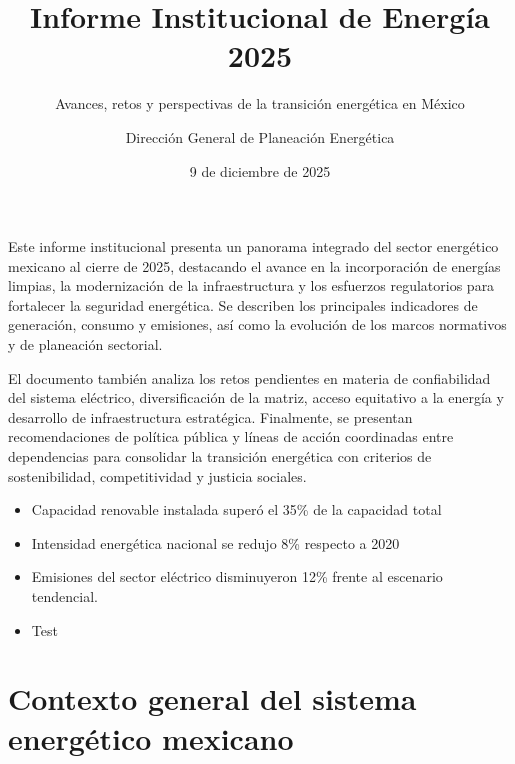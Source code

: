\documentclass{sener2025}
\title{Informe Institucional de Energía 2025}
\subtitle{Avances, retos y perspectivas de la transición energética en México}
\author{Dirección General de Planeación Energética}
\date{9 de diciembre de 2025}
\begin{document}

\tableofcontents
\newpage

\listafiguras
\newpage

\listatablas
\newpage

\begin{resumenejecutivo}
Este informe institucional presenta un panorama integrado del sector energético mexicano al cierre de 2025, destacando el avance en la incorporación de energías limpias, la modernización de la infraestructura y los esfuerzos regulatorios para fortalecer la seguridad energética. Se describen los principales indicadores de generación, consumo y emisiones, así como la evolución de los marcos normativos y de planeación sectorial.
 
 El documento también analiza los retos pendientes en materia de confiabilidad del sistema eléctrico, diversificación de la matriz, acceso equitativo a la energía y desarrollo de infraestructura estratégica. Finalmente, se presentan recomendaciones de política pública y líneas de acción coordinadas entre dependencias para consolidar la transición energética con criterios de sostenibilidad, competitividad y justicia sociales.
\end{resumenejecutivo}

\begin{datosclave}
  \begin{itemize}
    \item Capacidad renovable instalada superó el 35\% de la capacidad total
    \item Intensidad energética nacional se redujo 8\% respecto a 2020
    \item Emisiones del sector eléctrico disminuyeron 12\% frente al escenario tendencial.
    \item Test
  \end{itemize}
\end{datosclave}

\section{Contexto general del sistema energético mexicano}
\end{document}
